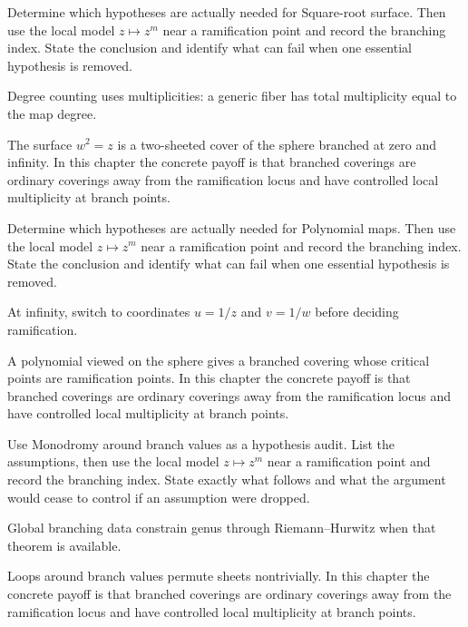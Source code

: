 \begin{exercise}\label{exr:iv24-05}
Determine which hypotheses are actually needed for Square-root surface. Then use the local model \(z\mapsto z^m\) near a ramification point and record the branching index. State the conclusion and identify what can fail when one essential hypothesis is removed.
\end{exercise}
\begin{hint}
Degree counting uses multiplicities: a generic fiber has total multiplicity equal to the map degree.
\end{hint}
\begin{solution}
The surface $w^2=z$ is a two-sheeted cover of the sphere branched at zero and infinity. In this chapter the concrete payoff is that branched coverings are ordinary coverings away from the ramification locus and have controlled local multiplicity at branch points.
\end{solution}

\begin{exercise}\label{exr:iv24-06}
Determine which hypotheses are actually needed for Polynomial maps. Then use the local model \(z\mapsto z^m\) near a ramification point and record the branching index. State the conclusion and identify what can fail when one essential hypothesis is removed.
\end{exercise}
\begin{hint}
At infinity, switch to coordinates \(u=1/z\) and \(v=1/w\) before deciding ramification.
\end{hint}
\begin{solution}
A polynomial viewed on the sphere gives a branched covering whose critical points are ramification points. In this chapter the concrete payoff is that branched coverings are ordinary coverings away from the ramification locus and have controlled local multiplicity at branch points.
\end{solution}

\begin{exercise}\label{exr:iv24-07}
Use Monodromy around branch values as a hypothesis audit. List the assumptions, then use the local model \(z\mapsto z^m\) near a ramification point and record the branching index. State exactly what follows and what the argument would cease to control if an assumption were dropped.
\end{exercise}
\begin{hint}
Global branching data constrain genus through Riemann--Hurwitz when that theorem is available.
\end{hint}
\begin{solution}
Loops around branch values permute sheets nontrivially. In this chapter the concrete payoff is that branched coverings are ordinary coverings away from the ramification locus and have controlled local multiplicity at branch points.
\end{solution}


